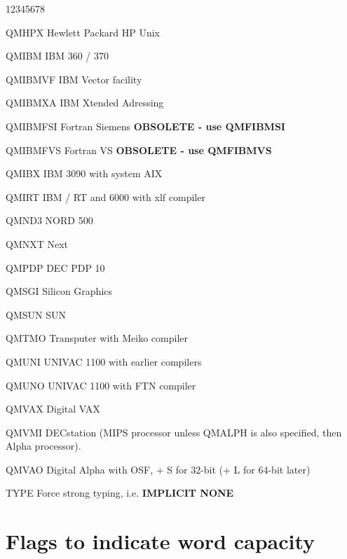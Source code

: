 \begin{DLtt}{12345678}
\item[QMHPX]   Hewlett Packard HP Unix\\

\item[QMIBM]   IBM 360 / 370
\item[QMIBMVF] IBM Vector facility
\item[QMIBMXA] IBM Xtended Adressing
\item[QMIBMFSI]Fortran Siemens {\bf OBSOLETE - use QMFIBMSI}
\item[QMIBMFVS]Fortran VS {\bf OBSOLETE - use QMFIBMVS}\\

\item[QMIBX]   IBM 3090 with system AIX
\item[QMIRT]   IBM / RT and 6000 with xlf compiler\\

\item[QMND3]   NORD 500
\item[QMNXT]   Next
\item[QMPDP]   DEC PDP 10\\

\item[QMSGI]   Silicon Graphics
\item[QMSUN]   SUN\\

\item[QMTMO]   Transputer with Meiko compiler
\item[QMUNI]   UNIVAC 1100  with earlier compilers
\item[QMUNO]   UNIVAC 1100  with FTN compiler\\

\item[QMVAX]   Digital VAX
\item[QMVMI]   DECstation (MIPS processor unless QMALPH is also specified, then Alpha processor).
\item[QMVAO]   Digital Alpha with OSF, + S for 32-bit
                                      (+ L for 64-bit later)\\

\item[TYPE]    Force strong typing, i.e. {\bf IMPLICIT NONE}
\end{DLtt}

\section{Flags to indicate word capacity}

